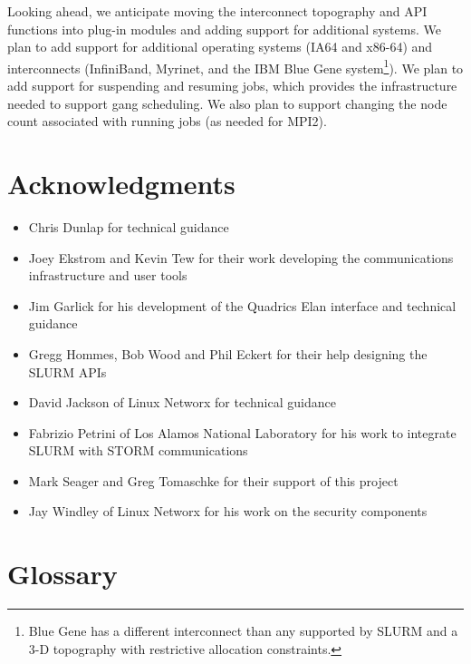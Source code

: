 Looking ahead, we anticipate moving the interconnect topography 
and API functions into plug-in modules and adding support for 
additional systems. 
We plan to add support for additional operating systems 
(IA64 and x86-64) and interconnects (InfiniBand, Myrinet, and 
the IBM Blue Gene\cite{BlueGene2002} system\footnote{Blue Gene 
has a different interconnect than any supported by SLURM and 
a 3-D topography with restrictive allocation constraints.}). 
We plan to add support for suspending and resuming jobs, which 
provides the infrastructure needed to support gang scheduling. 
We also plan to support changing the node count associated 
with running jobs (as needed for MPI2).

\section{Acknowledgments}

\begin{itemize}
\item Chris Dunlap for technical guidance
\item Joey Ekstrom and Kevin Tew for their work developing the communications
infrastructure and user tools
\item Jim Garlick for his development of the Quadrics Elan interface and 
technical guidance
\item Gregg Hommes, Bob Wood and Phil Eckert for their help designing the 
SLURM APIs
\item David Jackson of Linux Networx for technical guidance
\item Fabrizio Petrini of Los Alamos National Laboratory for his work to 
integrate SLURM with STORM communications 
\item Mark Seager and Greg Tomaschke for their support of this project
\item Jay Windley of Linux Networx for his work on the security components
\end{itemize}

\appendix
\newpage

\section{Glossary}

